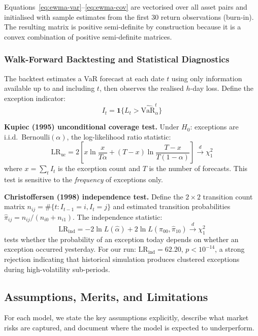\documentclass[11pt]{article}
\begin{document}
Equations~\eqref{eq:ewma-var}--\eqref{eq:ewma-cov} are vectorised over
all asset pairs and initialised with sample estimates from the first 30
return observations (burn-in).  The resulting matrix is positive
semi-definite by construction because it is a convex combination of
positive semi-definite matrices.

\subsubsection{Walk-Forward Backtesting and Statistical Diagnostics}

The backtest estimates a VaR forecast at each date $t$ using only
information available up to and including $t$, then observes the
realised $h$-day loss.  Define the exception indicator:
\[
I_t = \mathbf{1}\{L_t > \widehat{\mathrm{VaR}}_\alpha^t\}
\]

\textbf{Kupiec (1995) unconditional coverage test.}  Under $H_0$:
exceptions are i.i.d.\ Bernoulli$(\alpha)$, the log-likelihood ratio
statistic:
\[
\mathrm{LR}_{\mathrm{uc}}
= 2\!\left[
    x\ln\frac{x}{T\alpha}
  + (T-x)\ln\frac{T-x}{T(1-\alpha)}
  \right] \xrightarrow{d} \chi^2_1
\]
where $x = \sum_t I_t$ is the exception count and $T$ is the number of
forecasts.  This test is sensitive to the \emph{frequency} of exceptions
only.

\textbf{Christoffersen (1998) independence test.}  Define the $2\times2$
transition count matrix $n_{ij} = \#\{t: I_{t-1}=i, I_t=j\}$ and
estimated transition probabilities $\hat\pi_{ij} = n_{ij}/(n_{i0}+n_{i1})$.
The independence statistic:
\[
\mathrm{LR}_{\mathrm{ind}}
= -2\ln L(\hat\alpha)
  +2\ln L(\hat\pi_{00},\hat\pi_{10})
\xrightarrow{d} \chi^2_1
\]
tests whether the probability of an exception today depends on whether
an exception occurred yesterday.  For our run:
$\mathrm{LR}_{\mathrm{ind}} = 62.20$, $p < 10^{-14}$, a strong
rejection indicating that historical simulation produces clustered
exceptions during high-volatility sub-periods.

\subsection{Assumptions, Merits, and Limitations}
\label{sec:assumptions}

For each model, we state the key assumptions explicitly, describe what
market risks are captured, and document where the model is expected to
underperform.
\end{document}
